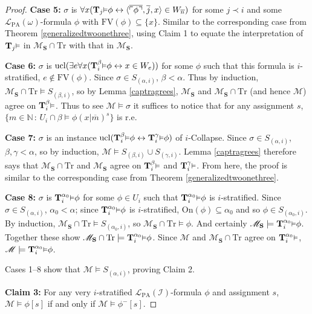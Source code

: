 \documentclass[reqno]{article}
\theoremstyle{definition}
\def\N{\mathbb{N}}
\def\L{\mathscr{L}}
\def\M{\mathscr{M}}
\def\T{\mathbf{T}}
\def\S{\mathbf{S}}
\def\FV{\mathrm{FV}}
\def\LPA{\L_{\mathrm{PA}}}
\def\indset{\mathcal I}
\def\onset{\mathrm{On}}
\def\Tr{\mathrm{Tr}}
\def\ctr{\cap\Tr}
\renewcommand{\Pr}[1]{\T_{#1}\mbox{\small${\vDash}$}}
\newcommand{\Prr}[2]{\T^{#1}_{#2}\mbox{\small${\vDash}$}}
\newcommand{\ucl}[1]{\mathrm{ucl}(#1)}
\newcommand{\case}[1]{\textbf{Case #1:}}
\newcommand{\claim}[1]{\textbf{Claim #1:}}
\begin{document}
\begin{proof}
\item\case5
$\sigma$ is $\forall x(\Pr j\phi\leftrightarrow\langle\overline{\ulcorner\phi\urcorner},\overline j,x\rangle
\in W_{\overline n})$ for some $j\prec i$ and some $\LPA(\omega)$-formula $\phi$ with $\FV(\phi)\subseteq\{x\}$.
Similar to the corresponding case from Theorem \ref{generalizedtwoonethree}, using Claim 1
to equate the interpretation of $\Pr j$ in $\M_\S\ctr$ with that in $\M_\S$.

\item\case6
$\sigma$ is $\ucl{\exists e\forall x(\Prr\beta i\phi\leftrightarrow x\in W_e)}$
for some $\phi$ such that this formula is $i$-stratified, $e\not\in\FV(\phi)$.
Since $\sigma\in S_{(\alpha,i)}$, $\beta<\alpha$.
Thus by induction, $\M_\S\ctr\models S_{(\beta,i)}$, so by Lemma \ref{captragrees},
$\M_\S$ and $\M_\S\ctr$ (and hence $\M$) agree on $\Prr\beta i$.
Thus to see $\M\models\sigma$ it suffices to notice that for any assignment $s$,
$\{m\in\N\,:\,U_i\cap\beta\models\phi(x|\overline m)^s\}$ is r.e.


\item\case7
$\sigma$ is an instance $\ucl{\Prr\beta i\phi\leftrightarrow\Prr\gamma i\phi}$ of $i$-Collapse.
Since $\sigma\in S_{(\alpha,i)}$, $\beta,\gamma<\alpha$,
so by induction, $\M\models S_{(\beta,i)}\cup S_{(\gamma,i)}$.
Lemma \ref{captragrees} therefore says that $\M_\S\ctr$ and $\M_\S$
agree on $\Prr\beta i$ and $\Prr\gamma i$.
From here,
the proof is
similar to the corresponding case from Theorem \ref{generalizedtwoonethree}.

\item\case8
$\sigma$ is $\Prr{\alpha_0}i\phi$ for some $\phi\in U_i$ such that $\Prr{\alpha_0}i\phi$ is $i$-stratified.
Since $\sigma\in S_{(\alpha,i)}$, $\alpha_0<\alpha$; since $\Prr{\alpha_0}i\phi$ is $i$-stratified,
$\onset(\phi)\subseteq\alpha_0$ and so $\phi\in S_{(\alpha_0,i)}$.
By induction, $\M_\S\ctr\models S_{(\alpha_0,i)}$, so $\M_\S\ctr\models\phi$.
And certainly $\M_\S\models\Prr{\alpha_0} i\phi$.
Together these show $\M_\S\ctr\models\Prr{\alpha_0}i\phi$.
Since $\M$ and $\M_\S\ctr$ agree on $\Prr{\alpha_0}i$, $\M\models\Prr{\alpha_0}i\phi$.


\item
Cases 1--8 show that $\M\models S_{(\alpha,i)}$, proving Claim 2.


\item
\claim3
For any very $i$-stratified $\LPA(\indset)$-formula $\phi$ and assignment $s$,
$\M\models\phi[s]$ if and only if $\M\models\phi^-[s]$.


\end{proof}
\end{document}
